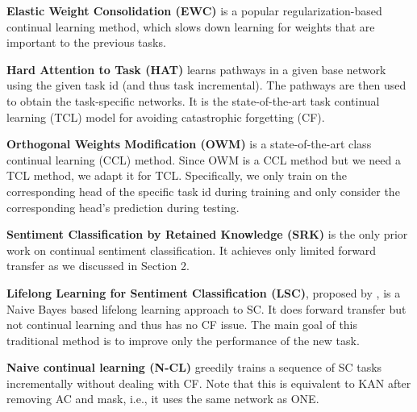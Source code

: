 \documentclass[runningheads]{llncs}
\begin{document}
\textbf{Elastic Weight Consolidation (EWC)} \cite{Kirkpatrick2017overcoming} is a popular regularization-based continual learning method, which slows down learning for weights that are important to the previous tasks.

\textbf{Hard Attention to Task (HAT)} \cite{DBLP:conf/icml/SerraSMK18} learns pathways in a given base network using the given task id (and thus task incremental). The pathways are then used to obtain the task-specific networks. It is the state-of-the-art {\color{black}task continual learning (TCL) model} for avoiding catastrophic forgetting (CF).

\textbf{Orthogonal Weights Modification (OWM)} \cite{zeng2019continuous} is a state-of-the-art class continual learning (CCL) method. Since OWM is a CCL method but we need a TCL method, we adapt it for TCL. Specifically, we only train on the corresponding head of the specific task id during training and only consider the corresponding head's prediction during testing.  

\textbf{Sentiment Classification by Retained Knowledge (SRK)} \cite{DBLP:conf/dasfaa/LvWLCZ19} is the only prior work on continual sentiment classification. It achieves only limited forward transfer as we discussed {\color{black}in Section 2}. 

\textbf{Lifelong Learning for Sentiment Classification (LSC)}, proposed by \cite{DBLP:conf/acl/ChenM015}, is a Naive Bayes based lifelong learning approach to SC. It does forward transfer but not continual learning and thus has no CF issue. The main goal of this traditional method is to improve only the performance of the new task. 





\textbf{Naive continual learning (N-CL)} greedily trains a sequence of SC tasks incrementally without dealing with CF. Note that this is equivalent to KAN after removing AC and mask, i.e., it uses the same network as ONE.








\begin{comment}

\item \textbf{Multi-task training}, similar to aggregated training, this approach considers all data in the task sequence simultaneously. The difference is that it further employ multi-head configuration so that each task has its own exclusive dense layer to perform classification. Therefore, such an approach has multiple losses and we simply add those losses together to get the final loss. This baseline provides a weak upper bound. 
\end{comment}
\end{document}
